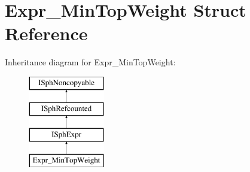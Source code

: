 \hypertarget{structExpr__MinTopWeight}{\section{Expr\-\_\-\-Min\-Top\-Weight Struct Reference}
\label{structExpr__MinTopWeight}
}
Inheritance diagram for Expr\-\_\-\-Min\-Top\-Weight\-:\begin{figure}[H]
\begin{center}
\leavevmode
\includegraphics[height=4.000000cm]{structExpr__MinTopWeight}
\end{center}
\end{figure}
